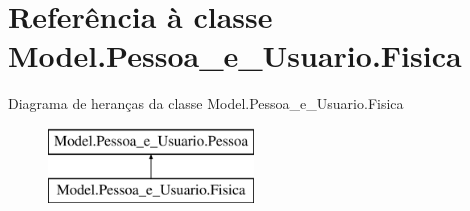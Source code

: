 \hypertarget{class_model_1_1_pessoa__e___usuario_1_1_fisica}{}\section{Referência à classe Model.\+Pessoa\+\_\+e\+\_\+\+Usuario.\+Fisica}
\label{class_model_1_1_pessoa__e___usuario_1_1_fisica}
Diagrama de heranças da classe Model.\+Pessoa\+\_\+e\+\_\+\+Usuario.\+Fisica\begin{figure}[H]
\begin{center}
\leavevmode
\includegraphics[height=2.000000cm]{class_model_1_1_pessoa__e___usuario_1_1_fisica}
\end{center}
\end{figure}
